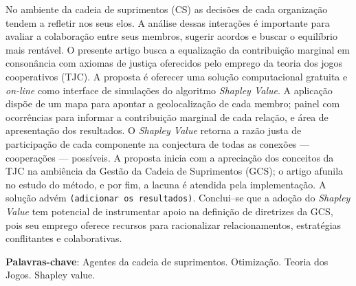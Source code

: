\documentclass[
	article,			        %
	11pt,				          %
	oneside,			        %
	a4paper,			        %
	english,			        %
	brazil,				        %
	sumario=tradicional
]{abntex2}\usepackage[]{graphicx}\usepackage[]{color}
\author{João B. G. Brito, \emph{Esp.}   \\   
    \href{mailto:jbgb@uol.com.br}{jbgb@uol.com.br} 
  \and {Michel J. Anzanello, \emph{Phd}} \\
    \href{mailto:michel.anzanello@gmail.com}{michel.anzanello@gmail.com}
}
\date{\today}
\begin{document}

\frenchspacing 


%
%
\maketitle


\begin{resumoumacoluna}
No ambiente da cadeia de suprimentos (CS) as decisões de cada organização tendem a refletir nos seus elos. A análise dessas interações é importante para avaliar a colaboração entre seus membros, sugerir acordos e buscar o equilíbrio mais rentável. O presente artigo busca a equalização da contribuição marginal em consonância com axiomas de justiça oferecidos pelo emprego da teoria dos jogos cooperativos (TJC). A proposta é oferecer uma solução computacional gratuita e \emph{on-line} como interface de simulações do algoritmo \emph{Shapley Value}. A aplicação dispõe de um mapa para apontar a geolocalização de cada membro; painel com ocorrências para informar a contribuição marginal de cada relação, e área de apresentação dos resultados. O \emph{Shapley Value} retorna a razão justa de participação de cada componente na conjectura de todas as conexões --- cooperações --- possíveis. A proposta inicia com a apreciação dos conceitos da TJC na ambiência da Gestão da Cadeia de Suprimentos (GCS); o artigo afunila no estudo do método, e por fim, a lacuna é atendida pela implementação. A solução advém \texttt{(adicionar os resultados)}. Conclui--se que a adoção do \emph{Shapley Value} tem potencial de instrumentar apoio na definição de diretrizes da GCS, pois seu emprego oferece recursos para racionalizar relacionamentos, estratégias conflitantes e colaborativas.

 \vspace{\onelineskip}
 
 \noindent
 \textbf{Palavras-chave}: Agentes da cadeia de suprimentos. Otimização. Teoria dos Jogos. Shapley value.
\end{resumoumacoluna}
\end{document}
